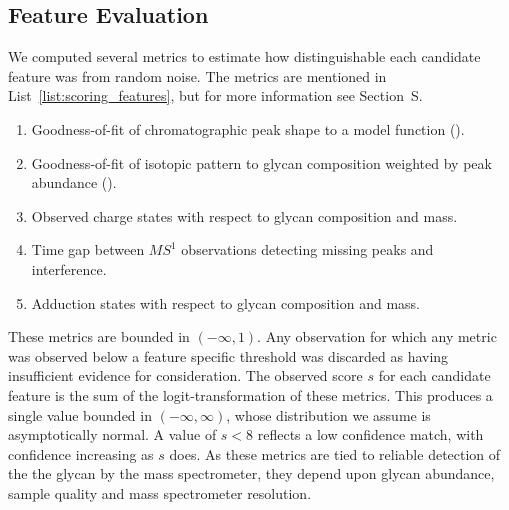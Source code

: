 \subsection{Feature Evaluation}
    We computed several metrics to estimate
    how distinguishable each candidate feature was from random noise. The
    metrics are mentioned in List~\ref{list:scoring_features}, but for more
    information see Section~S.
    \begin{ordlist}
    \begin{enumerate}
        \itemsep0em
        \caption{Chromatographic Feature Metrics\label{list:scoring_features}}
        \item Goodness-of-fit of chromatographic peak shape to a model function
              (\cite{Yu2010,Kronewitter2014}).
        \item Goodness-of-fit of isotopic pattern to glycan composition weighted
              by peak abundance (\cite{Maxwell2012}).
        \item Observed charge states with respect to glycan composition and mass.
        \item Time gap between $MS^1$ observations detecting missing peaks
              and interference.
        \item Adduction states with respect to glycan composition and mass.
    \end{enumerate}
    \end{ordlist}

    These metrics are bounded in $(-\infty, 1)$. Any observation for which any metric
    was observed below a feature specific threshold was discarded as having insufficient
    evidence for consideration. The observed score $s$ for each candidate feature is
    the sum of the logit-transformation of these metrics. This produces a single
    value bounded in $(-\infty, \infty)$, whose distribution we assume is asymptotically
    normal. A value of $s < 8$ reflects a low confidence match, with confidence increasing
    as $s$ does. As these metrics are tied to reliable detection of the the glycan
    by the mass spectrometer, they depend upon glycan abundance, sample quality and
    mass spectrometer resolution.

